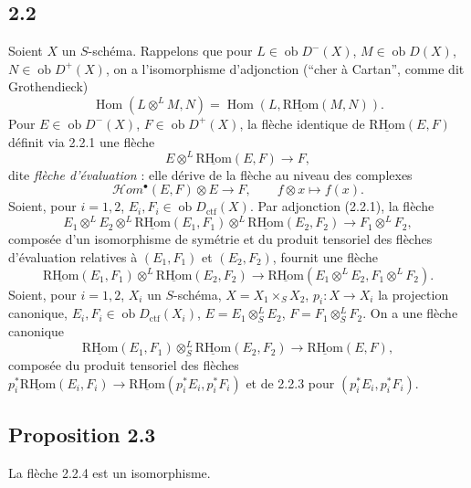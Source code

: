 \documentclass[11pt]{article}
\DeclareMathOperator{\Hom}{Hom}
\newcommand{\ob}{\operatorname{ob}}
\providecommand{\RHom}{\mathrm{RHom}}
\providecommand{\uRHom}{\underline{\RHom}}
\providecommand{\ctf}{\mathrm{ctf}}
\providecommand{\RHom}{\mathrm{RHom}}
\providecommand{\Hom}{\operatorname{Hom}}
\providecommand{\ob}{\operatorname{ob}}
\providecommand{\RHom}{\mathrm R\mathcal{H}om}
\providecommand{\RHom}{\mathrm{RHom}}
\providecommand{\Hom}{\operatorname{Hom}}
\begin{document}
\subsection*{2.2}
Soient $X$ un $S$-schéma. Rappelons que pour $L\in\ob D^{-}(X)$, $M\in\ob D(X)$, $N\in\ob D^{+}(X)$, on a l'isomorphisme d'adjonction (``cher à Cartan'', comme dit Grothendieck)
\begin{equation}\tag{2.2.1}
\Hom(L\otimes^{L}M,N)=\Hom(L,\uRHom(M,N)).
\end{equation}
Pour $E\in\ob D^{-}(X)$, $F\in\ob D^{+}(X)$, la flèche identique de $\uRHom(E,F)$ définit via 2.2.1 une flèche
\begin{equation}\tag{2.2.2}
E\otimes^{L}\uRHom(E,F)\longrightarrow F,
\end{equation}
dite \emph{flèche d'évaluation} : elle dérive de la flèche au niveau des complexes
\[
\mathcal Hom^{\bullet}(E,F)\otimes E\longrightarrow F,
\qquad f\otimes x\longmapsto f(x).
\]
Soient, pour $i=1,2$, $E_i,F_i\in\ob D_{\ctf}(X)$. Par adjonction (2.2.1), la flèche
\[
E_1\otimes^{L}E_2\otimes^{L}\uRHom(E_1,F_1)\otimes^{L}\uRHom(E_2,F_2)\longrightarrow F_1\otimes^{L}F_2,
\]
composée d'un isomorphisme de symétrie et du produit tensoriel des flèches d'évaluation relatives à $(E_1,F_1)$ et $(E_2,F_2)$, fournit une flèche
\begin{equation}\tag{2.2.3}
\uRHom(E_1,F_1)\otimes^{L}\uRHom(E_2,F_2)\longrightarrow\uRHom(E_1\otimes^{L}E_2,F_1\otimes^{L}F_2).
\end{equation}
Soient, pour $i=1,2$, $X_i$ un $S$-schéma, $X=X_1\times_SX_2$, $p_i:X\to X_i$ la projection canonique, $E_i,F_i\in\ob D_{\ctf}(X_i)$, $E=E_1\otimes^{L}_{S}E_2$, $F=F_1\otimes^{L}_{S}F_2$. On a une flèche canonique
\begin{equation}\tag{2.2.4}
\uRHom(E_1,F_1)\otimes^{L}_{S}\uRHom(E_2,F_2)\longrightarrow\uRHom(E,F),
\end{equation}
composée du produit tensoriel des flèches $p_i^{*}\uRHom(E_i,F_i)\to\uRHom(p_i^{*}E_i,p_i^{*}F_i)$ et de 2.2.3 pour $(p_i^{*}E_i,p_i^{*}F_i)$.

\subsection*{Proposition 2.3}
La flèche 2.2.4 est un isomorphisme.
\end{document}
